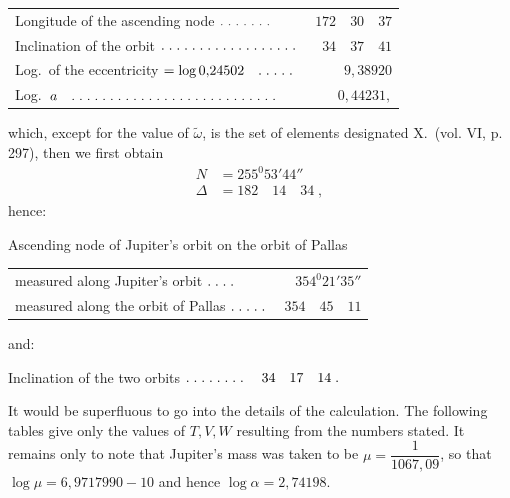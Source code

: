 \begin{landscape}
\begin{center}
\begin{tabular}{@{}l@{\quad}r@{}}
Longitude of the ascending node \(\VSixPoint\VSixPoint\VSixPoint\VSixPoint\VSixPoint\VSixPoint\VSixPoint\)&\(172\quad30\quad37\)\\
Inclination of the orbit \(\VSixTenPoints\VSixPoint\VSixPoint\VSixPoint\VSixPoint\VSixPoint\VSixPoint\VSixPoint\VSixPoint\)&\(34\quad37\quad41\)\\
Log.\ of the eccentricity \(=\log0{,}24502\quad\VSixPoint\VSixPoint\VSixPoint\VSixPoint\VSixPoint\)&\(9{,}38920\)\\
Log.\ \(a\quad\VSixTenPoints\VSixTenPoints\VSixPoint\VSixPoint\VSixPoint\VSixPoint\VSixPoint\VSixPoint\VSixPoint\)&\(0{,}44231,\)
\end{tabular}
\end{center}
\noindent which, except for the value of \(\tilde\omega\), is the set of elements designated X.\ (vol. VI, p. 297), then we first obtain
\[
\begin{aligned}
N&=255^0 53'44''\\
\Delta&=182\quad14\quad34\;,
\end{aligned}
\]
\noindent hence:
\begin{center}
Ascending node of Jupiter's orbit on the orbit of Pallas

\begin{tabular}{@{}l@{\quad}r@{}}
measured along Jupiter's orbit \(\VSixPoint\VSixPoint\VSixPoint\VSixPoint\)&\(354^0 21'35''\)\\
measured along the orbit of Pallas \(\VSixPoint\VSixPoint\VSixPoint\VSixPoint\VSixPoint\)&\(354\quad45\quad11\)
\end{tabular}
\end{center}
\par\noindent\edef\VSixSavedIndent{\the\parindent}\begin{minipage}{\linewidth}\setlength{\parindent}{\VSixSavedIndent}
\noindent and:
\begin{center}
Inclination of the two orbits \(\VSixPoint\VSixPoint\VSixPoint\VSixPoint\VSixPoint\VSixPoint\VSixPoint\VSixPoint\quad34\quad17\quad14\; .\)
\end{center}
\end{minipage}\par
\par\noindent\hspace*{\parindent}It would be superfluous to go into the details of the calculation. The following tables give only the values of \(T,V,W\) resulting from the numbers stated. It remains only to note that Jupiter's mass was taken to be \(\mu=\dfrac{1}{1067{,}09}\), so that \(\log\mu=6{,}9717990-10\) and hence \(\log\alpha=2{,}74198\).
\clearpage
\endgroup
\end{landscape}
